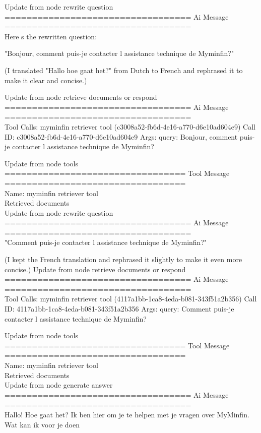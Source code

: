Update from node rewrite question
\\[1em]
================================== Ai Message ==================================
\\[1em]
Here s the rewritten question:

"Bonjour, comment puis-je contacter l assistance technique de Myminfin?" 

(I translated "Hallo hoe gaat het?" from Dutch to French and rephrased it to make it clear and concise.)

Update from node retrieve documents or respond
\\[1em]
================================== Ai Message ==================================
\\[1em]
Tool Calls:
myminfin retriever tool (c3008a52-fb6d-4e16-a770-d6e10ad604e9)
Call ID: c3008a52-fb6d-4e16-a770-d6e10ad604e9
Args:
query: Bonjour, comment puis-je contacter l assistance technique de Myminfin?

Update from node tools
\\[1em]
================================= Tool Message =================================
\\[1em]
Name: myminfin retriever tool
\\[1em]
Retrieved documents
\\[1em]

Update from node rewrite question
\\[1em]
================================== Ai Message ==================================
\\[1em]

"Comment puis-je contacter l assistance technique de Myminfin?" 

(I kept the French translation and rephrased it slightly to make it even more concise.)
Update from node retrieve documents or respond
\\[1em]
================================== Ai Message ==================================
\\[1em]
Tool Calls:
myminfin retriever tool (4117a1bb-1ca8-4eda-b081-343f51a2b356)
Call ID: 4117a1bb-1ca8-4eda-b081-343f51a2b356
Args:
query: Comment puis-je contacter l assistance technique de Myminfin?



Update from node tools
\\[1em]
================================= Tool Message =================================
\\[1em]
Name: myminfin retriever tool
\\[1em]
Retrieved documents
\\[1em]
Update from node generate answer
\\[1em]
================================== Ai Message ==================================
\\[1em]
Hallo! Hoe gaat het? Ik ben hier om je te helpen met je vragen over MyMinfin. Wat kan ik voor je doen
